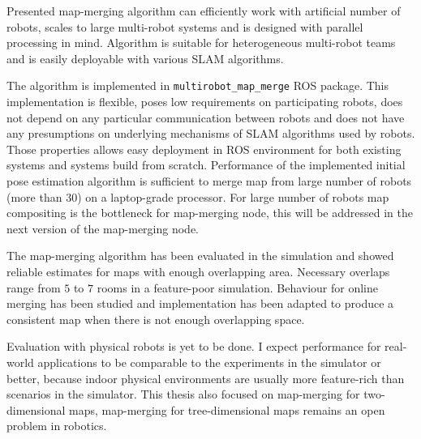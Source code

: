 
Presented map-merging algorithm can efficiently work with artificial number of robots, scales to large multi-robot systems and is designed with parallel processing in mind. Algorithm is suitable for heterogeneous multi-robot teams and is easily deployable with various \gls{SLAM} algorithms.

The algorithm is implemented in \texttt{multirobot\_map\_merge} \gls{ROS} package. This implementation is flexible, poses low requirements on participating robots, does not depend on any particular communication between robots and does not have any presumptions on underlying mechanisms of \gls{SLAM} algorithms used by robots. Those properties allows easy deployment in \gls{ROS} environment for both existing systems and systems build from scratch. Performance of the implemented initial pose estimation algorithm is sufficient to merge map from large number of robots (more than $30$) on a laptop-grade processor. For large number of robots map compositing is the bottleneck for map-merging node, this will be addressed in the next version of the map-merging node.

The map-merging algorithm has been evaluated in the simulation and showed reliable estimates for maps with enough overlapping area. Necessary overlaps range from $5$ to $7$ rooms in a feature-poor simulation. Behaviour for online merging has been studied and implementation has been adapted to produce a consistent map when there is not enough overlapping space.

Evaluation with physical robots is yet to be done. I expect performance for real-world applications to be comparable to the experiments in the simulator or better, because indoor physical environments are usually more feature-rich than scenarios in the simulator. This thesis also focused on map-merging for two-dimensional maps, map-merging for tree-dimensional maps remains an open problem in robotics.
